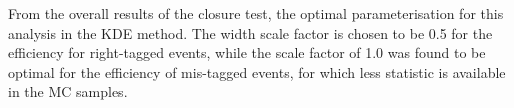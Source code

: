 From the overall results of the closure test, the optimal parameterisation for this analysis in the KDE method. The width scale factor is chosen to be 0.5 for the efficiency for right-tagged events, while the scale factor of 1.0 was found to be optimal for the efficiency of mis-tagged events, for which less statistic is available in the MC samples.













